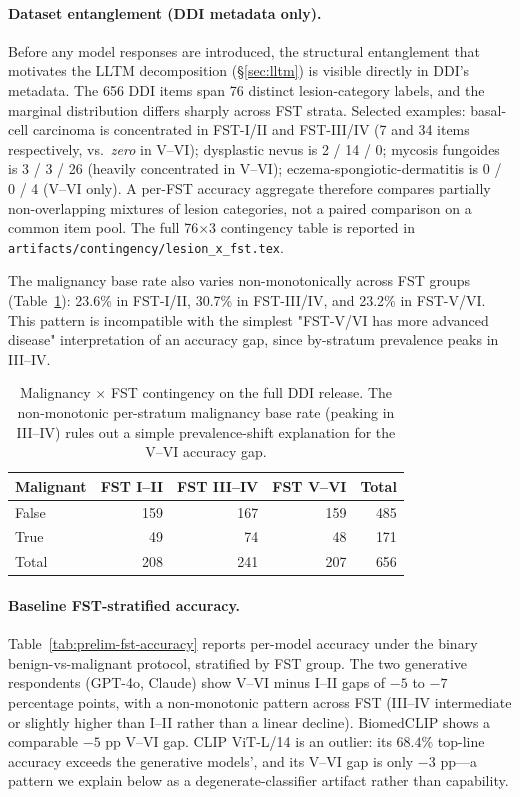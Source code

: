\documentclass{article}
\begin{document}
\paragraph{Dataset entanglement (DDI metadata only).}
\label{sec:prelim_entanglement}
Before any model responses are introduced, the structural entanglement that motivates the LLTM decomposition (\S\ref{sec:lltm}) is visible directly in DDI's metadata. The 656 DDI items span 76 distinct lesion-category labels, and the marginal distribution differs sharply across FST strata. Selected examples: basal-cell carcinoma is concentrated in FST-I/II and FST-III/IV (7 and 34 items respectively, vs.\ \emph{zero} in V--VI); dysplastic nevus is 2 / 14 / 0; mycosis fungoides is 3 / 3 / 26 (heavily concentrated in V--VI); eczema-spongiotic-dermatitis is 0 / 0 / 4 (V--VI only). A per-FST accuracy aggregate therefore compares partially non-overlapping mixtures of lesion categories, not a paired comparison on a common item pool. The full 76$\times$3 contingency table is reported in \texttt{artifacts/contingency/lesion\_x\_fst.tex}.

The malignancy base rate also varies non-monotonically across FST groups (Table~\ref{tab:contingency-malignant-fst}): 23.6\% in FST-I/II, 30.7\% in FST-III/IV, and 23.2\% in FST-V/VI. This pattern is incompatible with the simplest "FST-V/VI has more advanced disease" interpretation of an accuracy gap, since by-stratum prevalence peaks in III--IV.

\begin{table}[t]
\centering
\caption{Malignancy $\times$ FST contingency on the full DDI release. The non-monotonic per-stratum malignancy base rate (peaking in III--IV) rules out a simple prevalence-shift explanation for the V--VI accuracy gap.}
\label{tab:contingency-malignant-fst}
\begin{tabular}{lrrrr}
\toprule
Malignant & FST I--II & FST III--IV & FST V--VI & Total \\
\midrule
False & 159 & 167 & 159 & 485 \\
True  &  49 &  74 &  48 & 171 \\
\midrule
Total & 208 & 241 & 207 & 656 \\
\bottomrule
\end{tabular}
\end{table}

\paragraph{Baseline FST-stratified accuracy.}
Table~\ref{tab:prelim-fst-accuracy} reports per-model accuracy under the binary benign-vs-malignant protocol, stratified by FST group. The two generative respondents (GPT-4o, Claude) show V--VI minus I--II gaps of $-5$ to $-7$ percentage points, with a non-monotonic pattern across FST (III--IV intermediate or slightly higher than I--II rather than a linear decline). BiomedCLIP shows a comparable $-5$ pp V--VI gap. CLIP ViT-L/14 is an outlier: its $68.4\%$ top-line accuracy exceeds the generative models', and its V--VI gap is only $-3$ pp---a pattern we explain below as a degenerate-classifier artifact rather than capability.
\end{document}
